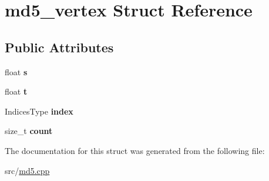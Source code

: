 \hypertarget{structmd5__vertex}{\section{md5\-\_\-vertex Struct Reference}
\label{structmd5__vertex}
}
\subsection*{Public Attributes}
\begin{DoxyCompactItemize}
\item 
\hypertarget{structmd5__vertex_a5871572faa2a072c6c7b0cd01e7c7bc6}{float {\bfseries s}}\label{structmd5__vertex_a5871572faa2a072c6c7b0cd01e7c7bc6}

\item 
\hypertarget{structmd5__vertex_abba81b2005b9ac1a39bbd86841a5fca0}{float {\bfseries t}}\label{structmd5__vertex_abba81b2005b9ac1a39bbd86841a5fca0}

\item 
\hypertarget{structmd5__vertex_a238817f83600a979b439f0bd930f9518}{Indices\-Type {\bfseries index}}\label{structmd5__vertex_a238817f83600a979b439f0bd930f9518}

\item 
\hypertarget{structmd5__vertex_a95c38680014f48d1e22f581a4b9e30e2}{size\-\_\-t {\bfseries count}}\label{structmd5__vertex_a95c38680014f48d1e22f581a4b9e30e2}

\end{DoxyCompactItemize}


The documentation for this struct was generated from the following file\-:\begin{DoxyCompactItemize}
\item 
src/\hyperlink{md5_8cpp}{md5.\-cpp}\end{DoxyCompactItemize}
